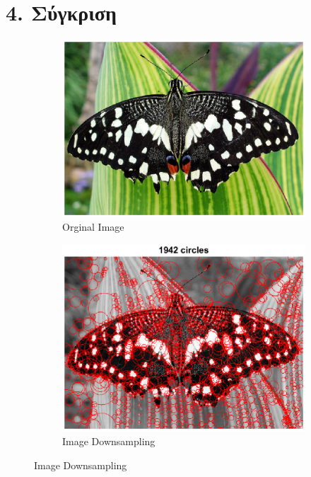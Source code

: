 \documentclass{article}
\newcommand{\tl}[1]{\textlatin{#1}}
\begin{document}
	\section*{4. Σύγκριση}
	
	\begin{figure}[H]
		\begin{subfigure}[b]{0.37\textwidth}
			\includegraphics[width=\textwidth]{res/butterfly.eps}
			\caption{\tl{Orginal Image}}
		\end{subfigure}%
		\begin{subfigure}[b]{0.37\textwidth}
			\includegraphics[width=\textwidth]{res/butterfly_blob_method2.eps}	
			\caption{\tl{Image Downsampling}}	
		\end{subfigure}%

\end{figure}
\end{document}

